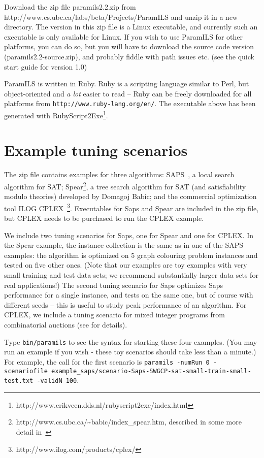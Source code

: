 \documentclass[10pt,letterpaper,twoside]{article}
\begin{document}
Download the zip file paramils2.2.zip from http://www.cs.ubc.ca/labs/beta/Projects/ParamILS and unzip
it in a new directory. 
The version in this zip file is a Linux executable, and currently such an executable is only available for Linux. 
If you wish to use ParamILS for other platforms, you can do so, but you will have to download the source code version
(paramils2.2-source.zip), and probably fiddle with path issues etc. (see the quick start guide for version 1.0)

ParamILS is written in Ruby. Ruby is a scripting language similar to Perl, but
object-oriented and \emph{a lot} easier to read -- Ruby can be freely downloaded for all 
platforms from \texttt{http://www.ruby-lang.org/en/}.
The executable above has been generated with RubyScript2Exe\footnote{http://www.erikveen.dds.nl/rubyscript2exe/index.html}.

\section{Example tuning scenarios}
The zip file contains examples for three algorithms: SAPS~\cite{HutTomHoo02}, a local search algorithm for SAT;
Spear\footnote{http://www.cs.ubc.ca/\~{}babic/index\_spear.htm, described in some more detail in~\cite{HutBabHooHu07}}, a tree search algorithm for SAT (and satisfiability modulo theories) developed by Domagoj Babic; and the commercial optimization tool ILOG CPLEX~\footnote{http://www.ilog.com/products/cplex/}.
Executables for Saps and Spear are included in the zip file, but CPLEX needs to be purchased to run the CPLEX example.

We include two tuning scenarios for Saps, one for Spear and one for CPLEX.
In the Spear example, the instance collection is the same as in one of the SAPS examples:
the algorithm is optimized on 5 graph colouring problem instances and tested on five other ones. 
(Note that our examples are toy examples with very small training and test data sets; we recommend
substantially larger data sets for real applications!)
The second tuning scenario for Saps optimizes Saps performance for a single instance,
and tests on the same one, but of course with different seeds -- this is useful to study peak 
performance of an algorithm.
For CPLEX, we include a tuning scenario for mixed integer programs from
combinatorial auctions (see \cite{LeyPeaSho00} for details).

Type \texttt{bin/paramils} to see the syntax for starting these four examples.
(You may run an example if you wish - these toy scenarios should take less than a minute.)
For example, the call for the first scenario is
\texttt{paramils -numRun 0 -scenariofile example\_saps/scenario-Saps-SWGCP-sat-small-train-small-test.txt -validN 100}.
\end{document}
